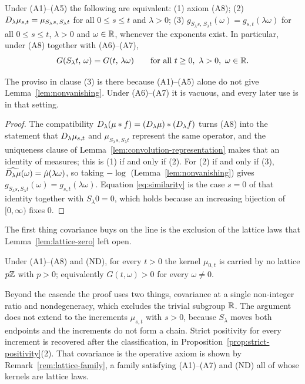 \begin{lemma}\label{lem:covariance-fourier}
Under (A1)--(A5) the following are equivalent: (1) axiom (A8); (2)
$D_{\lambda}\mu_{s,t} = \mu_{S_\lambda s,\,S_\lambda t}$ for all $0 \le s \le t$ and
$\lambda > 0$; (3) $g_{S_\lambda s,\,S_\lambda t}(\omega) = g_{s,t}(\lambda\omega)$ for all
$0 \le s \le t$, $\lambda > 0$ and $\omega \in \mathbb{R}$, whenever the exponents exist. In
particular, under (A8) together with (A6)--(A7),
\begin{equation}\label{eq:similarity}
  G(S_\lambda t,\,\omega) = G(t,\,\lambda\omega)
  \qquad \text{for all } t \ge 0,\ \lambda > 0,\ \omega \in \mathbb{R} .
\end{equation}
\end{lemma}

The proviso in clause (3) is there because (A1)--(A5) alone do not give
Lemma~\ref{lem:nonvanishing}. Under (A6)--(A7) it is vacuous, and every later use is in that
setting.

\begin{proof}
The compatibility $D_{\lambda}(\mu * f) = (D_{\lambda}\mu) * (D_{\lambda}f)$ turns (A8)
into the statement that $D_{\lambda}\mu_{s,t}$ and $\mu_{S_\lambda s,S_\lambda t}$ represent
the same operator, and the uniqueness clause of Lemma~\ref{lem:convolution-representation}
makes that an identity of measures; this is (1) if and only if (2). For (2) if and only if
(3), $\widehat{D_{\lambda}\mu}(\omega) = \hat\mu(\lambda\omega)$, so taking $-\log$
(Lemma~\ref{lem:nonvanishing}) gives $g_{S_\lambda s,S_\lambda t}(\omega) = g_{s,t}(\lambda\omega)$.
Equation \ref{eq:similarity} is the case $s = 0$ of that identity together with
$S_\lambda 0 = 0$, which holds because an increasing bijection of $[0,\infty)$ fixes $0$.
\end{proof}

The first thing covariance buys on the line is the exclusion of the lattice laws that
Lemma~\ref{lem:lattice-zero} left open.

\begin{lemma}\label{lem:no-lattice}
Under (A1)--(A8) and (ND), for every $t > 0$ the kernel $\mu_{0,t}$ is carried by no lattice
$p\mathbb{Z}$ with $p > 0$; equivalently $G(t,\omega) > 0$ for every $\omega \ne 0$.
\end{lemma}

Beyond the cascade the proof uses two things, covariance at a single non-integer ratio and
nondegeneracy, which excludes the trivial subgroup $\mathbb{R}$. The argument
does not extend to the increments $\mu_{s,t}$ with $s > 0$, because $S_\lambda$ moves both
endpoints and the increments do not form a chain. Strict positivity for every increment is
recovered after the classification, in Proposition~\ref{prop:strict-positivity}(2). That
covariance is the operative axiom is shown by Remark~\ref{rem:lattice-family}, a family
satisfying (A1)--(A7) and (ND) all of whose kernels are lattice laws.

